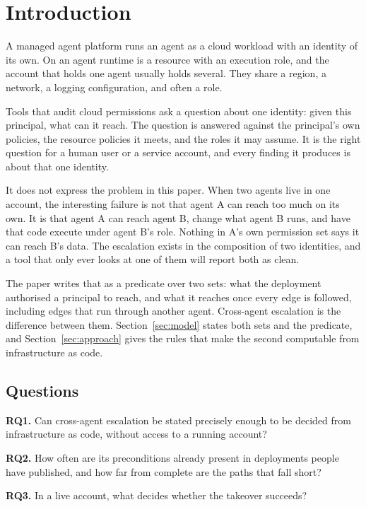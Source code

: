 \section{Introduction}
\label{sec:intro}

A managed agent platform runs an agent as a cloud workload with an identity of
its own. On \agentcore an agent runtime is a resource with an execution role,
and the account that holds one agent usually holds several. They share a
region, a network, a logging configuration, and often a role.

Tools that audit cloud permissions ask a question about one identity: given
this principal, what can it reach. The question is answered against the
principal's own policies, the resource policies it meets, and the roles it may
assume. It is the right question for a human user or a service account, and
every finding it produces is about that one identity.

It does not express the problem in this paper. When two agents live in
one account, the interesting failure is not that agent A can reach too much on
its own. It is that agent A can reach agent B, change what agent B runs, and
have that code execute under agent B's role. Nothing in A's own permission set
says it can reach B's data. The escalation exists in the composition of two
identities, and a tool that only ever looks at one of them will report both as
clean.

The paper writes that as a predicate over two sets: what the deployment
authorised a principal to reach, and what it reaches once every edge is
followed, including edges that run through another agent. Cross-agent
escalation is the difference between them.
Section~\ref{sec:model} states both sets and the predicate, and
Section~\ref{sec:approach} gives the rules that make the second computable
from infrastructure as code.

\subsection{Questions}

\noindent\textbf{RQ1.} Can cross-agent escalation be stated precisely enough to be
decided from infrastructure as code, without access to a running account?

\noindent\textbf{RQ2.} How often are its preconditions already present in deployments
people have published, and how far from complete are the paths that fall
short?

\noindent\textbf{RQ3.} In a live account, what decides whether the takeover succeeds?

